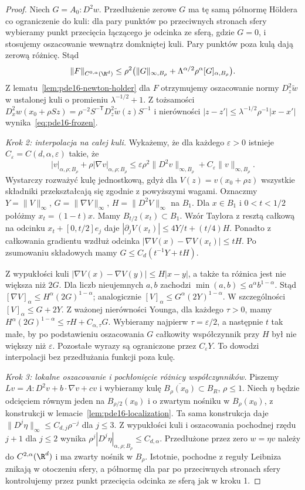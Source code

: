 \begin{proof}
Niech $G=A_0:D^2w$. Przedłużenie zerowe $G$
ma tę samą półnormę Höldera co ograniczenie do kuli:
dla pary punktów po przeciwnych stronach sfery
wybieramy punkt przecięcia łączącego je odcinka
ze sferą, gdzie $G=0$, i stosujemy oszacowanie
wewnątrz domkniętej kuli. Pary punktów poza kulą
dają zerową różnicę. Stąd
\[
 \|F\|_{C^{0,\alpha}(\R^d)}
 \le \rho^2\bigl(\|G\|_{\infty,B_\rho}
             +\Lambda^{\alpha/2}\rho^\alpha[G]_{\alpha,B_\rho}\bigr).
\]
Z lematu~\ref{lem:pde16-newton-holder} dla $F$
otrzymujemy oszacowanie normy $D_z^2\widetilde w$
w ustalonej kuli o promieniu $\lambda^{-1/2}+1$.
Z tożsamości
$D_x^2w(x_0+\rho Sz)=
\rho^{-2}S^{-\mathsf T}D_z^2\widetilde w(z)S^{-1}$
i nierówności
$|z-z'|\le\lambda^{-1/2}\rho^{-1}|x-x'|$
wynika~\eqref{eq:pde16-frozen}.

\emph{Krok 2: interpolacja na całej kuli.}
Wykażemy, że dla każdego $\varepsilon>0$ istnieje
$C_\varepsilon=C(d,\alpha,\varepsilon)$ takie, że
\[
 |v|_{\alpha,\rho;B_\rho}
 +\rho|\nabla v|_{\alpha,\rho;B_\rho}
 \le \varepsilon\rho^2\|D^2v\|_{\infty,B_\rho}
       +C_\varepsilon\|v\|_{\infty,B_\rho}.
\]
Wystarczy rozważyć kulę jednostkową, gdyż dla
$V(z)=v(x_0+\rho z)$ wszystkie składniki
przekształcają się zgodnie z powyższymi wagami.
Oznaczmy $Y=\|V\|_\infty$, $G=\|\nabla V\|_\infty$,
$H=\|D^2V\|_\infty$ na $B_1$.
Dla $x\in B_1$ i $0<t<1/2$ połóżmy $x_t=(1-t)x$.
Mamy $B_{t/2}(x_t)\subset B_1$.
Wzór Taylora z resztą całkową na odcinku
$x_t+[0,t/2]e_j$ daje
$|\partial_jV(x_t)|\le 4Y/t+(t/4)H$.
Ponadto z całkowania gradientu wzdłuż odcinka
$|\nabla V(x)-\nabla V(x_t)|\le tH$.
Po zsumowaniu składowych mamy
$G\le C_d(t^{-1}Y+tH)$.

Z wypukłości kuli
$|\nabla V(x)-\nabla V(y)|\le H|x-y|$,
a także ta różnica jest nie większa niż $2G$.
Dla liczb nieujemnych $a,b$ zachodzi
$\min(a,b)\le a^\alpha b^{1-\alpha}$.
Stąd $[\nabla V]_\alpha\le H^\alpha(2G)^{1-\alpha}$;
analogicznie $[V]_\alpha\le G^\alpha(2Y)^{1-\alpha}$.
W szczególności $[V]_\alpha\le G+2Y$.
Z ważonej nierówności Younga, dla każdego $\tau>0$,
mamy $H^\alpha(2G)^{1-\alpha}\le\tau H+C_{\alpha,\tau}G$.
Wybieramy najpierw $\tau=\varepsilon/2$, a następnie
$t$ tak małe, by po podstawieniu oszacowania $G$
całkowity współczynnik przy $H$ był nie większy
niż $\varepsilon$. Pozostałe wyrazy są ograniczone
przez $C_\varepsilon Y$. To dowodzi interpolacji
bez przedłużania funkcji poza kulę.

\emph{Krok 3: lokalne oszacowanie i pochłonięcie różnicy
współczynników.}
Piszemy $Lv=A:D^2v+b\cdot\nabla v+cv$ i wybieramy
kulę $\overline{B_\rho(x_0)}\subset B_R$, $\rho\le1$.
Niech $\eta$ będzie odcięciem równym jeden
na $B_{\rho/2}(x_0)$ i o zwartym nośniku w $B_\rho(x_0)$,
z konstrukcji w lemacie~\ref{lem:pde16-localization}.
Ta sama konstrukcja daje
$\|D^j\eta\|_\infty\le C_{d,j}\rho^{-j}$ dla $j\le3$.
Z wypukłości kuli i oszacowania pochodnej rzędu $j+1$
dla $j\le2$ wynika
$\rho^j|D^j\eta|_{\alpha,\rho;B_\rho}\le C_{d,\alpha}$.
Przedłużone przez zero $w=\eta v$ należy do
$C^{2,\alpha}(\R^d)$ i ma zwarty nośnik w $B_\rho$.
Istotnie, pochodne z reguły Leibniza znikają w otoczeniu
sfery, a półnormę dla par po przeciwnych stronach
sfery kontrolujemy przez punkt przecięcia odcinka
ze sferą jak w kroku 1.


\end{proof}
